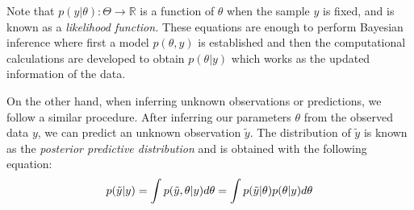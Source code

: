 Note that $p(y|\theta):\Theta \to \mathbb{R}$ is a function of $\theta$ when the sample $y$ is fixed, and is known as a \textit{likelihood function.} These equations are enough to perform Bayesian inference where first a model $p(\theta,y)$ is established and then the computational calculations are developed to obtain $p(\theta|y)$ which works as the updated information of the data.

On the other hand, when inferring unknown observations or predictions, we follow a similar procedure. After inferring our parameters $\theta$ from the observed data $y$, we can predict an unknown observation $\tilde{y} $. The distribution of $\tilde{y}$ is known as the \textit{posterior predictive distribution} and is obtained with the following equation:
%
\begin{equation*}
	p(\Tilde{y}|y)=\int p(\Tilde{y},\theta|y)d\theta =\int p(\Tilde{y}|\theta)p(\theta|y)d\theta
\end{equation*}
%
